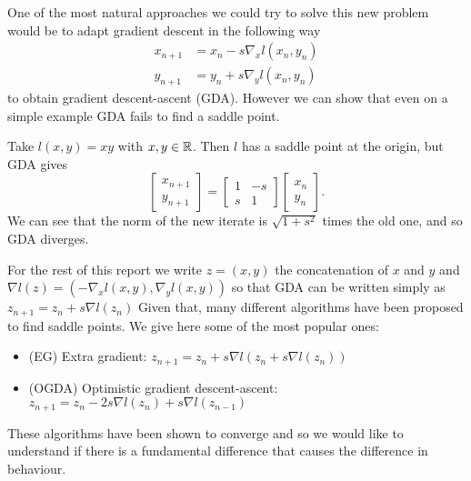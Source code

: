 \documentclass[main.tex]{subfiles}
\begin{document}
One of the most natural approaches we could try to solve this new problem would
be to adapt gradient descent in the following way
\begin{align*}
	x_{n+1}   & = x_n - s \nabla_x l(x_n, y_n) \\
	y_{n + 1} & = y_n + s \nabla_y l(x_n, y_n)
\end{align*}
to obtain gradient descent-ascent (GDA). However we can show that even on a
simple example GDA fails to find a saddle point.
\begin{ex}
	Take $l(x,y) = xy$ with $x, y \in \mathbb{R}$. Then $l$ has a saddle point at the origin, but GDA gives
	\[
		\begin{bmatrix}
			x_{n+1} \\
			y_{n+1}
		\end{bmatrix}
		= \begin{bmatrix}
			1 & - s \\
			s & 1
		\end{bmatrix}
		\begin{bmatrix}
			x_n \\
			y_n
		\end{bmatrix}.
	\]
	We can see that the norm of the new iterate is $\sqrt{1 + s^2}$ times
	the old one, and so GDA diverges.
\end{ex}
For the rest of this report we write $z = (x,y)$ the concatenation of $x$ and
$y$ and $\nabla l(z) = (-\nabla_x l(x,y), \nabla_y l(x,y))$ so that GDA can be
written simply as $z_{n+1} = z_n + s \nabla l(z_n)$
Given that, many different algorithms have been proposed to find saddle points.
We give here some of the most popular ones:
\begin{itemize}
	\item (EG) Extra gradient: $z_{n+1} = z_n + s \nabla l(z_n + s \nabla
		      l(z_n))$
	\item (OGDA) Optimistic gradient descent-ascent: $z_{n+1} = z_n - 2s \nabla
		      l(z_n) + s \nabla l(z_{n-1})$
\end{itemize}
These algorithms have been shown to converge  and so we would like to understand if there is a fundamental difference
that causes the difference in behaviour.
\end{document}
